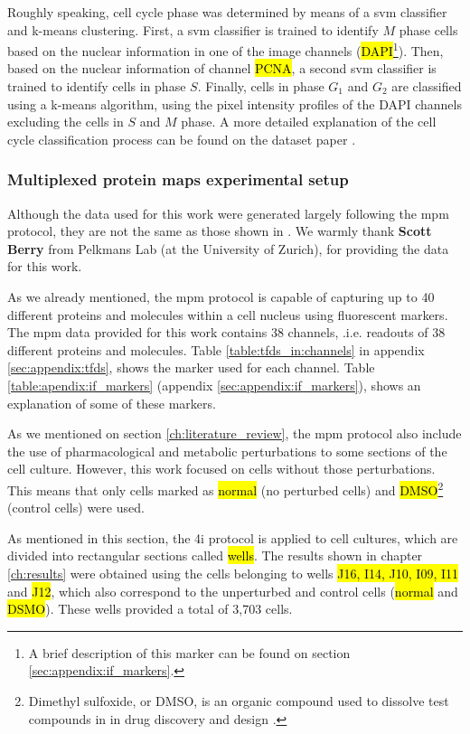 Roughly speaking, cell cycle phase was determined by means of a \gls{svm} classifier and k-means clustering. First, a \gls{svm} classifier is trained to identify $M$ phase cells based on the nuclear information in one of the image channels (\hl{DAPI}\footnote{A brief description of this marker can be found on section \ref{sec:appendix:if_markers}.}). Then, based on the nuclear information of channel \hl{PCNA}, a second \gls{svm} classifier is trained to identify cells in phase $S$. Finally, cells in phase $G_1$ and $G_2$ are classified using a k-means algorithm, using the pixel intensity profiles of the DAPI channels excluding the cells in $S$ and $M$ phase. A more detailed explanation of the cell cycle classification process can be found on the dataset paper \cite{Guteaar7042}.

\subsubsection{Multiplexed protein maps experimental setup}

Although the data used for this work were generated largely following the \gls{mpm} protocol, they are not the same as those shown in \cite{Guteaar7042}.
We warmly thank \textbf{Scott Berry} from Pelkmans Lab (at the University of Zurich), for providing the data for this work.

As we already mentioned, the \gls{mpm} protocol is capable of capturing up to 40 different proteins and molecules within a cell nucleus using fluorescent markers.
The \gls{mpm} data provided for this work contains 38 channels, .i.e. readouts of 38 different proteins and molecules. Table \ref{table:tfds_in:channels} in appendix \ref{sec:appendix:tfds}, shows the marker used for each channel. Table \ref{table:apendix:if_markers} (appendix \ref{sec:appendix:if_markers}), shows an explanation of some of these markers.

As we mentioned on section \ref{ch:literature_review}, the \gls{mpm} protocol also include the use of pharmacological and metabolic perturbations to some sections of the cell culture. However, this work focused on cells without those perturbations. This means that only cells marked as \hl{normal} (no perturbed cells) and \hl{DMSO}\footnote{Dimethyl sulfoxide, or DMSO, is an organic compound used to dissolve test compounds in in drug discovery and design \cite{cushnie2020bioprospecting}.} (control cells) were used.

As mentioned in this section, the \gls{4i} protocol is applied to cell cultures, which are divided into rectangular sections called \hl{wells}. The results shown in chapter \ref{ch:results} were obtained using the cells belonging to wells \hl{J16, I14, J10, I09, I11} and \hl{J12}, which also correspond to the unperturbed and control cells (\hl{normal} and \hl{DSMO}). These wells provided a total of 3,703 cells.

